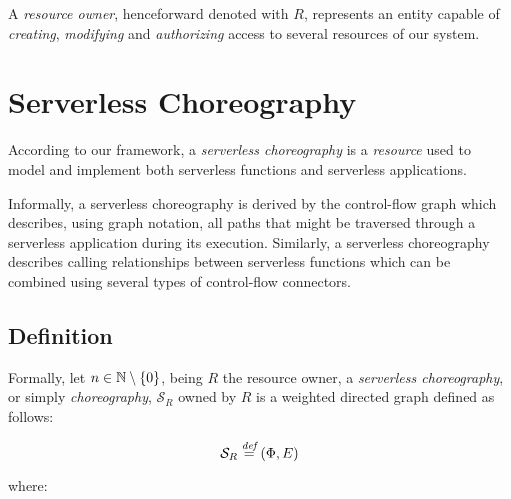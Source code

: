 A \textit{resource owner}, henceforward denoted with $R$, represents an entity capable of \textit{creating}, \textit{modifying} and \textit{authorizing} access to several resources of our system.

\section{Serverless Choreography}

According to our framework, a \textit{serverless choreography} is a \textit{resource} used to model and implement both serverless functions and serverless applications.

Informally, a serverless choreography is derived by the control-flow graph which describes, using graph notation, all paths that might be traversed through a serverless application during its execution. Similarly, a serverless choreography describes calling relationships between serverless functions which can be combined using several types of control-flow connectors.

\subsection{Definition}

Formally, let $n \in \mathbb{N} \setminus \left\lbrace 0 \right\rbrace $, being $R$ the resource owner, a \textit{serverless choreography}, or simply \textit{choreography}, $\mathcal{S}_R$ owned by $R$ is a weighted directed graph defined as follows:

\begin{equation}
	\mathcal{S}_R \overset{\textit{def}}{=} (\Phi,E)
\end{equation}

where:

